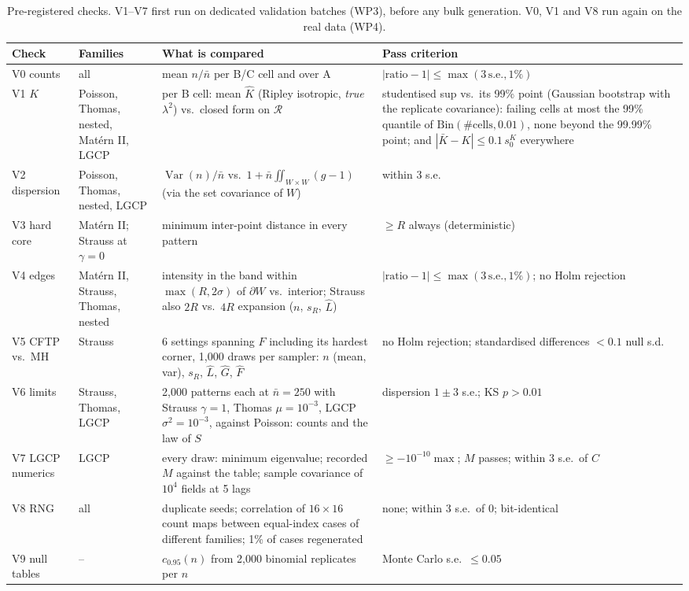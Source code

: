 \documentclass[10pt,a4paper]{article}
\newcommand{\nbar}{\bar n}
\newcommand{\R}{\mathcal{R}}
\begin{document}
\begin{table}[ht]
\centering\small
\begin{tabularx}{\linewidth}{@{}l l L L@{}}
\toprule
Check & Families & What is compared & Pass criterion\\
\midrule
V0 counts & all & mean $n/\nbar$ per B/C cell and over A & $|\text{ratio}-1|\le\max(3\,\text{s.e.},1\%)$\\
V1 $K$ & Poisson, Thomas, nested, Mat\'ern II, LGCP & per B cell: mean $\hat K$ (Ripley isotropic, \emph{true} $\lambda^2$) vs.\ closed form on $\R$ & studentised sup vs.\ its 99\% point (Gaussian bootstrap with the replicate covariance): failing cells at most the 99\% quantile of $\text{Bin}(\#\text{cells},0.01)$, none beyond the 99.99\% point; and $|\bar K-K|\le0.1\,s_0^K$ everywhere\\
V2 dispersion & Poisson, Thomas, nested, LGCP & $\operatorname{Var}(n)/\nbar$ vs.\ $1+\nbar\iint_{W\times W}(g-1)$ (via the set covariance of $W$) & within 3 s.e.\\
V3 hard core & Mat\'ern II; Strauss at $\gamma=0$ & minimum inter-point distance in every pattern & $\ge R$ always (deterministic)\\
V4 edges & Mat\'ern II, Strauss, Thomas, nested & intensity in the band within $\max(R,2\sigma)$ of $\partial W$ vs.\ interior; Strauss also $2R$ vs.\ $4R$ expansion ($n$, $s_R$, $\hat L$) & $|\text{ratio}-1|\le\max(3\,\text{s.e.},1\%)$; no Holm rejection\\
V5 CFTP vs.\ MH & Strauss & 6 settings spanning $F$ including its hardest corner, 1{,}000 draws per sampler: $n$ (mean, var), $s_R$, $\hat L$, $\hat G$, $\hat F$ & no Holm rejection; standardised differences $<0.1$ null s.d.\\
V6 limits & Strauss, Thomas, LGCP & 2{,}000 patterns each at $\nbar=250$ with Strauss $\gamma=1$, Thomas $\mu=10^{-3}$, LGCP $\sigma^2=10^{-3}$, against Poisson: counts and the law of $S$ & dispersion $1\pm3$ s.e.; KS $p>0.01$\\
V7 LGCP numerics & LGCP & every draw: minimum eigenvalue; recorded $M$ against the table; sample covariance of $10^4$ fields at 5 lags & $\ge-10^{-10}\max$; $M$ passes; within 3 s.e.\ of $C$\\
V8 RNG & all & duplicate seeds; correlation of $16\times16$ count maps between equal-index cases of different families; 1\% of cases regenerated & none; within 3 s.e.\ of 0; bit-identical\\
V9 null tables & -- & $c_{0.95}(n)$ from 2{,}000 binomial replicates per $n$ & Monte Carlo s.e.\ $\le0.05$\\
\bottomrule
\end{tabularx}
\caption{Pre-registered checks. V1--V7 first run on dedicated validation batches (WP3), before any bulk generation. V0, V1 and V8 run again on the real data (WP4).}
\label{tab:valid}
\end{table}
\end{document}
